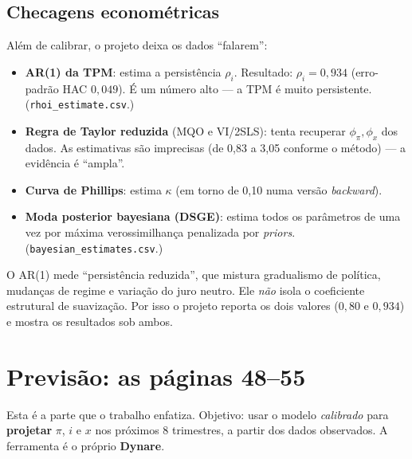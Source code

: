 \documentclass[11pt,a4paper]{article}
\begin{document}
\subsection{Checagens econométricas}
Além de calibrar, o projeto deixa os dados ``falarem'':
\begin{itemize}[nosep]
  \item \textbf{AR(1) da TPM}: estima a persistência $\rho_i$. Resultado: $\rho_i=0{,}934$ (erro-padrão
        HAC $0{,}049$). É um número alto --- a TPM é muito persistente. (\texttt{rhoi\_estimate.csv}.)
  \item \textbf{Regra de Taylor reduzida} (MQO e VI/2SLS): tenta recuperar $\phi_\pi,\phi_x$ dos dados.
        As estimativas são imprecisas (de 0,83 a 3,05 conforme o método) --- a evidência é ``ampla''.
  \item \textbf{Curva de Phillips}: estima $\kappa$ (em torno de 0,10 numa versão \emph{backward}).
  \item \textbf{Moda posterior bayesiana (DSGE)}: estima todos os parâmetros de uma vez por máxima
        verossimilhança penalizada por \emph{priors}. (\texttt{bayesian\_estimates.csv}.)
\end{itemize}

\begin{atencao}
O AR(1) mede ``persistência reduzida'', que mistura gradualismo de política, mudanças de regime e
variação do juro neutro. Ele \emph{não} isola o coeficiente estrutural de suavização. Por isso o
projeto reporta os dois valores ($0{,}80$ e $0{,}934$) e mostra os resultados sob ambos.
\end{atencao}

\section{Previsão: as páginas 48--55}

Esta é a parte que o trabalho enfatiza. Objetivo: usar o modelo \emph{calibrado} para
\textbf{projetar} $\pi$, $i$ e $x$ nos próximos 8 trimestres, a partir dos dados observados. A
ferramenta é o próprio \textbf{Dynare}.
\end{document}
